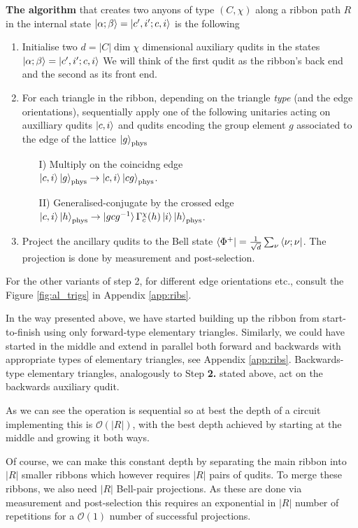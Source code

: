 \documentclass[two column]{article}
\begin{document}
\textbf{The algorithm} that creates two anyons of type $(C,\chi)$ along a ribbon path $R$ in the internal state $\ket{\alpha; \beta} = \ket{c', i'; c, i}$ is the following
\begin{enumerate}
    \item Initialise two $d=|C| \operatorname{dim} \chi$ dimensional auxiliary qudits in the states $\ket{\alpha; \beta} = \ket{c', i'; c, i}$  We will think of the first qudit as the ribbon's back end and the second as its front end.
    \item For each triangle in the ribbon, depending on the triangle \textit{type} (and the edge orientations), sequentially apply one of the following unitaries acting on auxilliary qudits $\ket{c, i}$ and qudits encoding the group element $g$ associated to the edge of the lattice $\ket{g}_\text{phys}$  
    \begin{itemize}
        \item[I)] Multiply on the coincidng edge\\  $\ket{c, i}\ket{g}_\text{phys} \rightarrow \ket{c, i}\ket{cg}_\text{phys}$.
       \item[II)] Generalised-conjugate by the crossed edge\\ $\ket{c,i}\ket{h}_\text{phys} \rightarrow \ket{gcg^{-1}} \Gamma^\chi_c(h) \ket{i} \ket{h}_\text{phys}$.
    \end{itemize}
    \item Project the ancillary qudits to the Bell state $\bra{\Phi^+} = \frac{1}{\sqrt{d}}\sum_\nu \bra{\nu; \nu}$. The projection is done by measurement and post-selection.
\end{enumerate}
For the other variants of step 2, for different edge orientations etc., consult the Figure \ref{fig:al_trigs} in Appendix \ref{app:ribs}. 

In the way presented above, we have started building up the ribbon from start-to-finish using only forward-type elementary triangles. Similarly, we could have started in the middle and extend in parallel both forward and backwards with appropriate types of elementary triangles, see Appendix \ref{app:ribs}. Backwards-type elementary triangles, analogously to Step \textbf{2.} stated above, act on the backwards auxiliary qudit.

As we can see the operation is sequential so at best the depth of a circuit implementing this is $\mathcal{O}(|R|)$, with the best depth achieved by starting at the middle and growing it both ways.

Of course, we can make this constant depth by separating the main ribbon into $|R|$ smaller ribbons which however requires $|R|$ pairs of qudits. To merge these ribbons, we also need $|R|$ Bell-pair projections. As these are done via measurement and post-selection this requires an exponential in $|R|$ number of repetitions for a $\mathcal{O}(1)$ number of successful projections.
\end{document}
